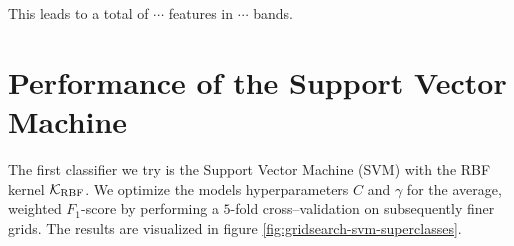 This leads to a total of $\cdots$ features in $\cdots$ bands.


\section{Performance of the Support Vector Machine}

The first classifier we try is the Support Vector Machine (SVM) with the RBF kernel $\mathcal{K}_{\text{RBF}}$. We optimize the models hyperparameters $C$ and $\gamma$ for the average, weighted $F_1$-score by performing a $5$-fold cross--validation on subsequently finer grids. The results are visualized in figure \ref{fig:gridsearch-svm-superclasses}.

